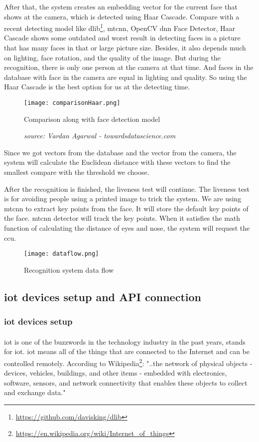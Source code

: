 After that, the system creates an embedding vector for the current face that shows at the camera, which is detected using Haar Cascade. Compare with a recent detecting model like dlib\footnote{\url{https://github.com/davisking/dlib}}, \acrshort{mtcnn}\cite{Zhang_2016}, OpenCV \acrshort{dnn} Face Detector, Haar Cascade shows some outdated and worst result in detecting faces in a picture that has many faces in that or large picture size. Besides, it also depends much on lighting, face rotation, and the quality of the image. But during the recognition, there is only one person at the camera at that time. And faces in the database with face in the camera are equal in lighting and quality. So using the Haar Cascade is the best option for us at the detecting time.

\begin{figure}[H]
    \centering
    \texttt{[image: comparisonHaar.png]}
    \caption{Comparison along with face detection model}
    \caption*{\textit{source: Vardan Agarwal - towardsdatascience.com}}
\end{figure}

Since we got vectors from the database and the vector from the camera, the system will calculate the Euclidean distance with these vectors to find the smallest compare with the threshold we choose.

After the recognition is finished, the liveness test will continue. The liveness test is for avoiding people using a printed image to trick the system. We are using \acrshort{mtcnn} to extract key points from the face. It will store the default key points of the face. \acrshort{mtcnn} detector will track the key points. When it satisfies the math function of calculating the distance of eyes and nose, the system will request the \acrlong{ccu}.

\begin{figure}[H]
    \centering
    \texttt{[image: dataflow.png]}
    \caption{Recognition system data flow}
\end{figure}

\subsection{\acrshort{iot} devices setup and API connection}
\subsubsection{\acrshort{iot} devices setup}
\paragraph{}
\acrshort{iot} is one of the buzzwords in the technology industry in the past years, stands for \acrlong{iot}. \acrshort{iot} means all of the things that are connected to the Internet and can be controlled remotely. According to Wikipedia\footnote{\url{https://en.wikipedia.org/wiki/Internet_of_things}}: 
"..the network of physical objects - devices, vehicles, buildings, and other items - embedded with electronics, software, sensors, and network connectivity that enables these objects to collect and exchange data."

